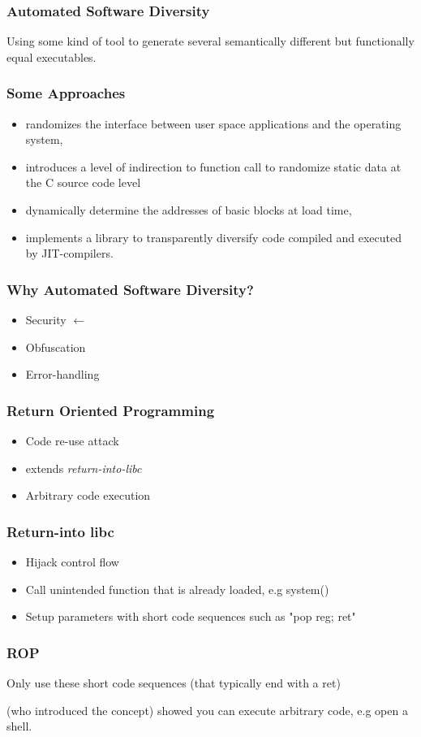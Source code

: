 \begin{frame}
	\frametitle{Automated Software Diversity}

	Using some kind of tool to generate several semantically different but functionally
	equal executables.

\end{frame}

\begin{frame}
	\frametitle{Some Approaches}

	\begin{itemize}
		\item \textcite{os-randomization}
randomizes the interface between user space applications and the operating system,
		\item \textcite{mem-exploits} introduces a level of indirection to function call to
			randomize static data at the C source code level
		\item \textcite{binary-stirring} dynamically determine the addresses of basic blocks
			at load time,
		\item \textcite{librando} implements a library to transparently diversify code compiled
			and executed by JIT-compilers.
	\end{itemize}

\end{frame}

\begin{frame}
	\frametitle{Why Automated Software Diversity?}

	\begin{itemize}
		\item Security $\leftarrow$
		\item Obfuscation
		\item	Error-handling
	\end{itemize}

\end{frame}


\begin{frame}
	\frametitle{Return Oriented Programming}
		\begin{itemize}
			\item Code re-use attack
			\item extends \textit{return-into-libc}
			\item Arbitrary code execution
		\end{itemize}
\end{frame}

\begin{frame}
	\frametitle{Return-into libc}

	\begin{itemize}
		\item Hijack control flow
		\item Call unintended function that is already loaded, e.g system()
		\item Setup parameters with short code sequences such as "pop reg; ret"
	\end{itemize}
\end{frame}

\begin{frame}
	\frametitle{ROP}

	Only use these short code sequences (that typically end with a ret)

	\vspace{0.5cm}

	\textcite{rop} (who introduced the concept) showed you can execute arbitrary code, e.g
	open a shell.
\end{frame}
